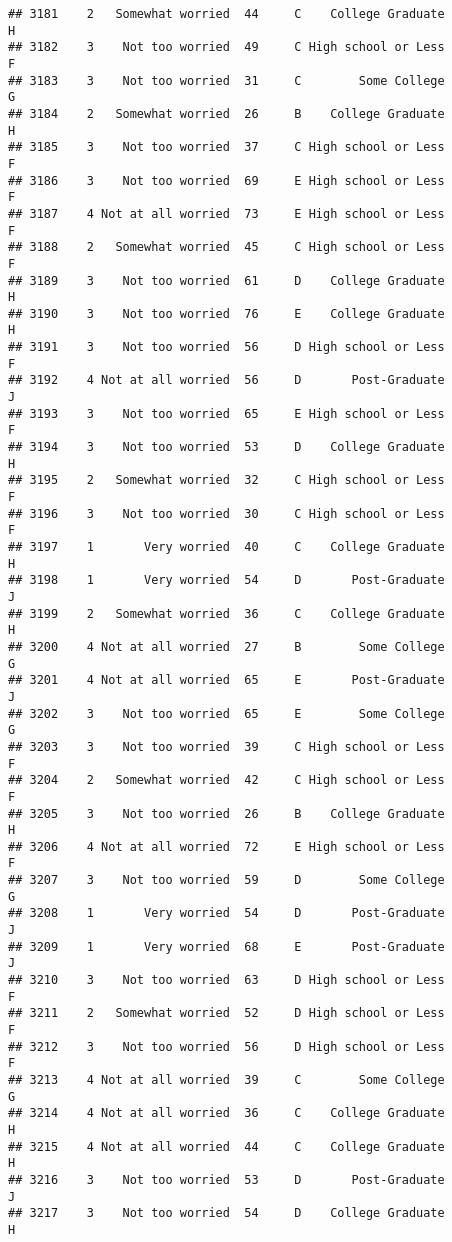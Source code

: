 \documentclass[
]{article}
\begin{document}
\begin{verbatim}
## 3181    2   Somewhat worried  44     C    College Graduate         H
## 3182    3    Not too worried  49     C High school or Less         F
## 3183    3    Not too worried  31     C        Some College         G
## 3184    2   Somewhat worried  26     B    College Graduate         H
## 3185    3    Not too worried  37     C High school or Less         F
## 3186    3    Not too worried  69     E High school or Less         F
## 3187    4 Not at all worried  73     E High school or Less         F
## 3188    2   Somewhat worried  45     C High school or Less         F
## 3189    3    Not too worried  61     D    College Graduate         H
## 3190    3    Not too worried  76     E    College Graduate         H
## 3191    3    Not too worried  56     D High school or Less         F
## 3192    4 Not at all worried  56     D       Post-Graduate         J
## 3193    3    Not too worried  65     E High school or Less         F
## 3194    3    Not too worried  53     D    College Graduate         H
## 3195    2   Somewhat worried  32     C High school or Less         F
## 3196    3    Not too worried  30     C High school or Less         F
## 3197    1       Very worried  40     C    College Graduate         H
## 3198    1       Very worried  54     D       Post-Graduate         J
## 3199    2   Somewhat worried  36     C    College Graduate         H
## 3200    4 Not at all worried  27     B        Some College         G
## 3201    4 Not at all worried  65     E       Post-Graduate         J
## 3202    3    Not too worried  65     E        Some College         G
## 3203    3    Not too worried  39     C High school or Less         F
## 3204    2   Somewhat worried  42     C High school or Less         F
## 3205    3    Not too worried  26     B    College Graduate         H
## 3206    4 Not at all worried  72     E High school or Less         F
## 3207    3    Not too worried  59     D        Some College         G
## 3208    1       Very worried  54     D       Post-Graduate         J
## 3209    1       Very worried  68     E       Post-Graduate         J
## 3210    3    Not too worried  63     D High school or Less         F
## 3211    2   Somewhat worried  52     D High school or Less         F
## 3212    3    Not too worried  56     D High school or Less         F
## 3213    4 Not at all worried  39     C        Some College         G
## 3214    4 Not at all worried  36     C    College Graduate         H
## 3215    4 Not at all worried  44     C    College Graduate         H
## 3216    3    Not too worried  53     D       Post-Graduate         J
## 3217    3    Not too worried  54     D    College Graduate         H

\end{verbatim}
\end{document}
